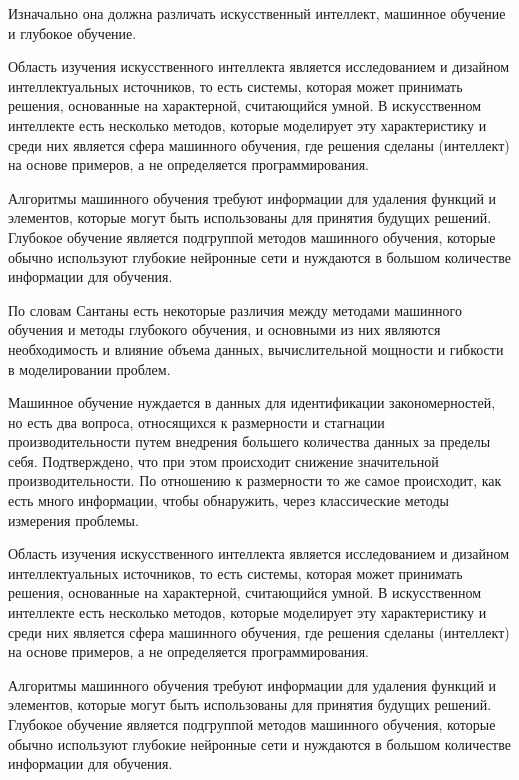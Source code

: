Изначально она должна различать искусственный интеллект, машинное обучение и глубокое обучение.


Область изучения искусственного интеллекта является исследованием и дизайном интеллектуальных источников,
то есть системы, которая может принимать решения,
основанные на характерной, считающийся умной.
В искусственном интеллекте есть несколько методов,
которые моделирует эту характеристику и среди них является сфера машинного обучения,
где решения сделаны (интеллект) на основе примеров,
а не определяется программирования.

Алгоритмы машинного обучения требуют информации для удаления функций и элементов,
которые могут быть использованы для принятия будущих решений.
Глубокое обучение является подгруппой методов машинного обучения,
которые обычно используют глубокие нейронные сети и нуждаются
в большом количестве информации для обучения.

По словам Сантаны есть некоторые различия между методами машинного обучения и методы глубокого обучения,
и основными из них являются необходимость и влияние объема данных,
вычислительной мощности и гибкости в моделировании проблем.

Машинное обучение нуждается в данных для идентификации закономерностей, но есть два вопроса,
относящихся к размерности и стагнации производительности путем внедрения большего количества данных за пределы себя.
Подтверждено, что при этом происходит снижение значительной производительности.
По отношению к размерности то же самое происходит,
как есть много информации, чтобы обнаружить,
через классические методы измерения проблемы.


Область изучения искусственного интеллекта является исследованием и дизайном интеллектуальных источников,
то есть системы, которая может принимать решения, основанные на характерной, считающийся умной.
В искусственном интеллекте есть несколько методов, которые моделирует эту характеристику и среди них является сфера машинного обучения,
где решения сделаны (интеллект) на основе примеров, а не определяется программирования.

Алгоритмы машинного обучения требуют информации для удаления функций и элементов,
которые могут быть использованы для принятия будущих решений.
Глубокое обучение является подгруппой методов машинного обучения,
которые обычно используют глубокие нейронные сети и нуждаются в большом количестве информации для обучения. 

